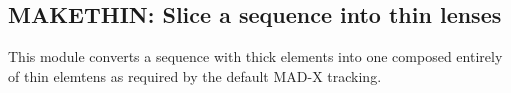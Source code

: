



\subsection{MAKETHIN: Slice a sequence into thin lenses}
 This module converts a sequence with thick elements into one composed entirely of thin elemtens as required by the default MAD-X tracking. 
 
